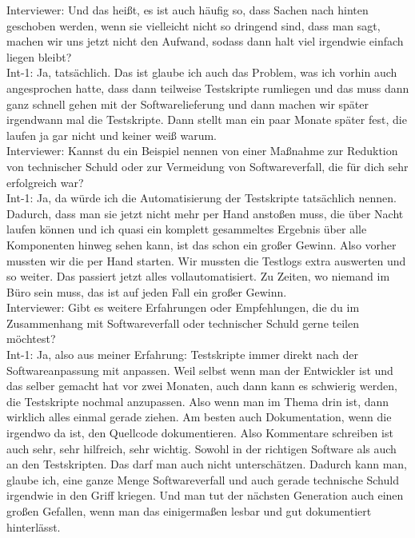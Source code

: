 Interviewer: Und das heißt, es ist auch häufig so, dass Sachen nach hinten geschoben werden, wenn sie vielleicht nicht so dringend sind, dass man sagt, machen wir uns jetzt nicht den Aufwand, sodass dann halt viel irgendwie einfach liegen bleibt?\\
Int-1: Ja, tatsächlich. Das ist glaube ich auch das Problem, was ich vorhin auch angesprochen hatte, dass dann teilweise Testskripte rumliegen und das muss dann ganz schnell gehen mit der Softwarelieferung und dann machen wir später irgendwann mal die Testskripte. Dann stellt man ein paar Monate später fest, die laufen ja gar nicht und keiner weiß warum. \\
Interviewer: Kannst du ein Beispiel nennen von einer Maßnahme zur Reduktion von technischer Schuld oder zur Vermeidung von Softwareverfall, die für dich sehr erfolgreich war? \\
Int-1: Ja, da würde ich die Automatisierung der Testskripte tatsächlich nennen. Dadurch, dass man sie jetzt nicht mehr per Hand anstoßen muss, die über Nacht laufen können und ich quasi ein komplett gesammeltes Ergebnis über alle Komponenten hinweg sehen kann, ist das schon ein großer Gewinn. Also vorher mussten wir die per Hand starten. Wir mussten die Testlogs extra auswerten und so weiter. Das passiert jetzt alles vollautomatisiert. Zu Zeiten, wo niemand im Büro sein muss, das ist auf jeden Fall ein großer Gewinn. \\
Interviewer: Gibt es weitere Erfahrungen oder Empfehlungen, die du im Zusammenhang mit Softwareverfall oder technischer Schuld gerne teilen möchtest?\\
Int-1: Ja, also aus meiner Erfahrung: Testskripte immer direkt nach der Softwareanpassung mit anpassen. Weil selbst wenn man der Entwickler ist und das selber gemacht hat vor zwei Monaten, auch dann kann es schwierig werden, die Testskripte nochmal anzupassen. Also wenn man im Thema drin ist, dann wirklich alles einmal gerade ziehen. Am besten auch Dokumentation, wenn die irgendwo da ist, den Quellcode dokumentieren. Also Kommentare schreiben ist auch sehr, sehr hilfreich, sehr wichtig. Sowohl in der richtigen Software als auch an den Testskripten. Das darf man auch nicht unterschätzen. Dadurch kann man, glaube ich, eine ganze Menge Softwareverfall und auch gerade technische Schuld irgendwie in den Griff kriegen. Und man tut der nächsten Generation auch einen großen Gefallen, wenn man das einigermaßen lesbar und gut dokumentiert hinterlässt.\\


